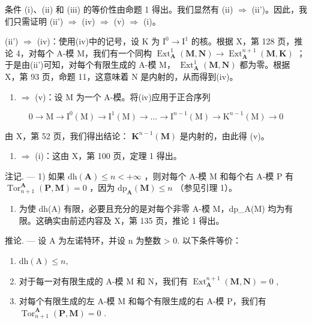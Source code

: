 条件 (i)、(ii) 和 (iii) 的等价性由命题 1 得出。我们显然有 (ii) \(\Rightarrow\) (ii')。因此，我们只需证明 (ii') \(\Rightarrow\) (iv) \(\Rightarrow\) (v) \(\Rightarrow\) (i)。

(ii') \(\Rightarrow\) (iv)：使用(iv)中的记号，设 K 为 \(\mathrm{I}^{0} \to \mathrm{I}^{1}\) 的核。根据 X，第 128 页，推论 4，对每个 A-模 M，我们有一个同构 \(\operatorname{Ext}_{\mathbf{A}}^{1}(\mathbf{M}, \mathbf{N}) \to \operatorname{Ext}_{\mathbf{A}}^{n+1}(\mathbf{M}, \mathbf{K})\) ；于是由(ii')可知，对每个有限生成的 A-模 M， \(\operatorname{Ext}_{\mathbf{A}}^{1}(\mathbf{M}, \mathbf{N})\) 都为零。根据 X，第 93 页，命题 11，这意味着 N 是内射的，从而得到(iv)。

\begin{enumerate}
\def\labelenumi{(\roman{enumi})}
\setcounter{enumi}{3}
\tightlist
\item
  \(\Rightarrow\) (v)：设 M 为一个 A-模。将(iv)应用于正合序列
\end{enumerate}

\[
0 \rightarrow \mathrm{M} \rightarrow \mathrm{I} ^ {0} (\mathrm{M}) \rightarrow \mathrm{I} ^ {1} (\mathrm{M}) \rightarrow \dots \rightarrow \mathrm{I} ^ {n - 1} (\mathrm{M}) \rightarrow \mathrm{K} ^ {n - 1} (\mathrm{M}) \rightarrow 0
\]

由 X，第 52 页，我们得出结论： \(\mathbf{K}^{n-1}(\mathbf{M})\) 是内射的，由此得 (v)。

\begin{enumerate}
\def\labelenumi{(\alph{enumi})}
\setcounter{enumi}{21}
\tightlist
\item
  \(\Rightarrow\) (i)：这由 X，第 100 页，定理 1 得出。
\end{enumerate}

注记. --- 1) 如果 \(\mathrm{dh}(\mathbf{A}) \leqslant n < +\infty\) ，则对每个 A-模 M 和每个右 A-模 P 有 \(\operatorname{Tor}_{n+1}^{\mathbf{A}}(\mathbf{P}, \mathbf{M}) = 0\) ，因为 \(\mathrm{dp}_{\mathbf{A}}(\mathbf{M}) \leqslant n\) （参见引理 1）。

\begin{enumerate}
\def\labelenumi{\arabic{enumi})}
\setcounter{enumi}{1}
\tightlist
\item
  为使 dh(A) 有限，必要且充分的是对每个非零 A-模 M，dp\_A(M) 均为有限。这确实由前述内容及 X，第 135 页，推论 1 得出。
\end{enumerate}

推论. --- 设 A 为左诺特环，并设 n 为整数 \textgreater{} 0. 以下条件等价：

\begin{enumerate}
\def\labelenumi{(\roman{enumi})}
\item
  \(\mathrm{dh(A)}\leqslant n,\)
\item
  对于每一对有限生成的 A-模 M 和 N，我们有 \(\operatorname{Ext}_{\mathbf{A}}^{n+1}(\mathbf{M}, \mathbf{N}) = 0\) ,
\item
  对每个有限生成的左 A-模 M 和每个有限生成的右 A-模 P，我们有 \(\operatorname{Tor}_{n+1}^{\mathbf{A}}(\mathbf{P},\mathbf{M}) = 0\) .
\end{enumerate}

